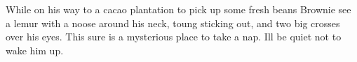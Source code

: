 While on his way to a cacao plantation to pick up some fresh beans Brownie see a lemur with a noose around his neck, toung sticking out, and two big crosses over his eyes.
This sure is a mysterious place to take a nap. Ill be quiet not to wake him up.
